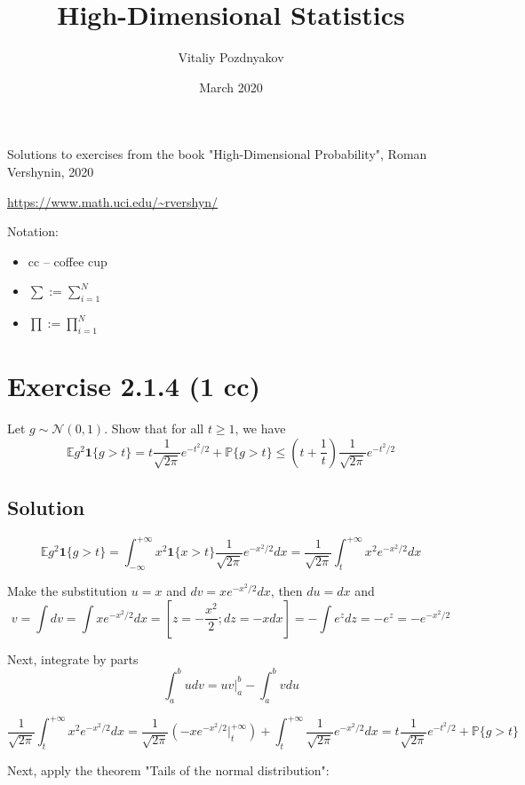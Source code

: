 \documentclass{article}
\author{Vitaliy Pozdnyakov}
\title{High-Dimensional Statistics}
\date{March 2020}
\begin{document}
\maketitle

Solutions to exercises from the book "High-Dimensional Probability", Roman Vershynin, 2020

\url{https://www.math.uci.edu/~rvershyn/}

\bigskip

Notation:
\begin{itemize}
    \item cc -- coffee cup
    \item $\sum := \sum_{i=1}^N$
    \item $\prod := \prod_{i=1}^N$
\end{itemize}

\setcounter{tocdepth}{1}
\tableofcontents

\section{Exercise 2.1.4 (1 cc)}

Let $g \sim \mathcal N(0, 1)$. Show that for all $t \geq 1$, we have
$$\mathbb E g^2 \mathbf 1\{g>t\} = t \frac{1}{\sqrt{2 \pi}}e^{-{t^2}/{2}} + \mathbb P\{g>t\} \leq \left(t+\frac{1}{t}\right)\frac{1}{\sqrt{2 \pi}}e^{-{t^2}/{2}}$$

\subsection{Solution}
$$\mathbb E g^2 \mathbf 1\{g>t\} 
= \int_{-\infty}^{+\infty}x^2 \mathbf 1\{x>t\} \frac{1}{\sqrt{2 \pi}}e^{-{x^2}/{2}}dx 
= \frac{1}{\sqrt{2 \pi}} \int_{t}^{+\infty}x^2 e^{-{x^2}/{2}}dx$$

Make the substitution $u = x$ and $dv = xe^{-{x^2}/{2}}dx$, then $du = dx$ and $$v = \int dv = \int xe^{-{x^2}/{2}}dx = \left[z = -\frac{x^2}{2}; dz = -xdx\right] = - \int e^z dz = - e^z = - e^{-{x^2}/{2}}$$

Next, integrate by parts $$\int_a^b udv = uv\Big|_a^b - \int_a^b vdu$$

$$\frac{1}{\sqrt{2 \pi}} \int_{t}^{+\infty}x^2 e^{-{x^2}/{2}}dx 
= \frac{1}{\sqrt{2 \pi}}\left(-xe^{-{x^2}/{2}}\Big|_t^{+\infty}\right) + \int_{t}^{+\infty}\frac{1}{\sqrt{2 \pi}}e^{-{x^2}/{2}} dx 
= t \frac{1}{\sqrt{2 \pi}}e^{-{t^2}/{2}} + \mathbb P\{g>t\}$$

Next, apply the theorem "Tails of the normal distribution":
\end{document}
